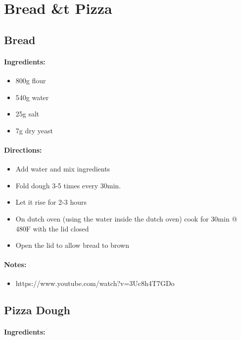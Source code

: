 \documentclass{article}
\begin{document}
\section{Bread \&t Pizza}

\subsection{Bread}{}

\paragraph{Ingredients:}

\begin{itemize}
	\item 800g flour
	\item 540g water
	\item 25g salt
	\item 7g dry yeast
\end{itemize}

\paragraph{Directions:}
\begin{itemize}
	\item Add water and mix ingredients
	\item Fold dough 3-5 times every 30min.
	\item Let it rise for 2-3 hours
	\item On dutch oven (using the water inside the dutch oven) cook for 30min @ 480F with the lid closed
	\item Open the lid to allow bread to brown
\end{itemize}

\paragraph{Notes:}
\begin{itemize}
	\item https://www.youtube.com/watch?v=3Uc8h4T7GDo
\end{itemize}

\subsection{Pizza Dough}


\paragraph{Ingredients:}
\end{document}
